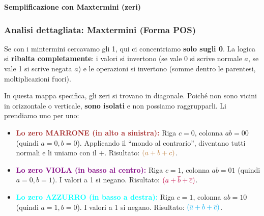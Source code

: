 \begin{center}
\textbf{Semplificazione con Maxtermini (zeri)}\\[0.5em]
\end{center}

\subsubsection*{Analisi dettagliata: Maxtermini (Forma POS)}
Se con i mintermini cercavamo gli 1, qui ci concentriamo \textbf{solo sugli 0}. La logica si \textbf{ribalta completamente}: i valori si invertono (se vale 0 si scrive normale $a$, se vale 1 si scrive negata $\overline{a}$) e le operazioni si invertono (somme dentro le parentesi, moltiplicazioni fuori).

In questa mappa specifica, gli zeri si trovano in diagonale. Poiché non sono vicini in orizzontale o verticale, \textbf{sono isolati} e non possiamo raggrupparli. Li prendiamo uno per uno:

\begin{itemize}
    \item \textcolor{brown}{\textbf{Lo zero MARRONE (in alto a sinistra):}} Riga $c=0$, colonna $ab=00$ (quindi $a=0, b=0$). Applicando il ``mondo al contrario'', diventano tutti normali e li uniamo con il $+$. Risultato: $\textcolor{brown}{(a + b + c)}$.
    \item \textcolor{purple}{\textbf{Lo zero VIOLA (in basso al centro):}} Riga $c=1$, colonna $ab=01$ (quindi $a=0, b=1$). I valori a 1 si negano. Risultato: $\textcolor{purple}{(a + \overline{b} + \overline{c})}$.
    \item \textcolor{cyan}{\textbf{Lo zero AZZURRO (in basso a destra):}} Riga $c=1$, colonna $ab=10$ (quindi $a=1, b=0$). I valori a 1 si negano. Risultato: $\textcolor{cyan}{(\overline{a} + b + \overline{c})}$.
\end{itemize}

